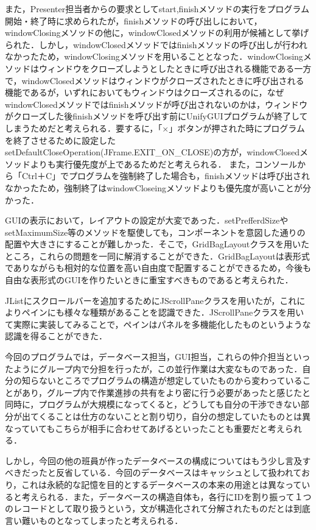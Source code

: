 \documentclass[12pt]{jarticle}
\begin{document}
また，Presenter担当者からの要求としてstart,finishメソッドの実行をプログラム開始・終了時に求められたが，finishメソッドの呼び出しにおいて，windowClosingメソッドの他に，windowClosedメソッドの利用が候補として挙げられた．しかし，windowClosedメソッドではfinishメソッドの呼び出しが行われなかったため，windowClosingメソッドを用いることとなった．windowClosingメソッドはウィンドウをクローズしようとしたときに呼び出される機能である一方で，windowClosedメソッドはウィンドウがクローズされたときに呼び出される機能であるが，いずれにおいてもウィンドウはクローズされるのに，なぜwindowClosedメソッドではfinishメソッドが呼び出されないのかは，ウィンドウがクローズした後finishメソッドを呼び出す前にUnifyGUIプログラムが終了してしまうためだと考えられる．要するに，「×」ボタンが押された時にプログラムを終了させるために設定したsetDefaultCloseOperation(JFrame.EXIT\_ON\_CLOSE)の方が，windowClosedメソッドよりも実行優先度が上であるためだと考えられる．
また，コンソールから「Ctrl＋C」でプログラムを強制終了した場合も，finishメソッドは呼び出されなかったため，強制終了はwindowCloseingメソッドよりも優先度が高いことが分かった．

GUIの表示において，レイアウトの設定が大変であった．setPrefferdSizeやsetMaximumSize等のメソッドを駆使しても，コンポーネントを意図した通りの配置や大きさにすることが難しかった．そこで，GridBagLayoutクラスを用いたところ，これらの問題を一同に解消することができた．GridBagLayoutは表形式でありながらも相対的な位置を高い自由度で配置することができるため，今後も自由な表形式のGUIを作りたいときに重宝すべきものであると考えられた．

JListにスクロールバーを追加するためにJScrollPaneクラスを用いたが，これによりペインにも様々な種類があることを認識できた．JScrollPaneクラスを用いて実際に実装してみることで，ペインはパネルを多機能化したものというような認識を得ることができた．

今回のプログラムでは，データベース担当，GUI担当，これらの仲介担当といったようにグループ内で分担を行ったが，この並行作業は大変なものであった．自分の知らないところでプログラムの構造が想定していたものから変わっていることがあり，グループ内で作業進捗の共有をより密に行う必要があったと感じたと同時に，プログラムが大規模になってくると，どうしても自分の干渉できない部分が出てくることは仕方のないことと割り切り，自分の想定していたものとは異なっていてもこちらが相手に合わせてあげるといったことも重要だと考えられる．

しかし，今回の他の班員が作ったデータベースの構成についてはもう少し言及すべきだったと反省している．今回のデータベースはキャッシュとして扱われており，これは永続的な記憶を目的とするデータベースの本来の用途とは異なっていると考えられる．また，データベースの構造自体も，各行にIDを割り振って１つのレコードとして取り扱うという，文が構造化されて分解されたものだとは到底言い難いものとなってしまったと考えられる．
\end{document}
